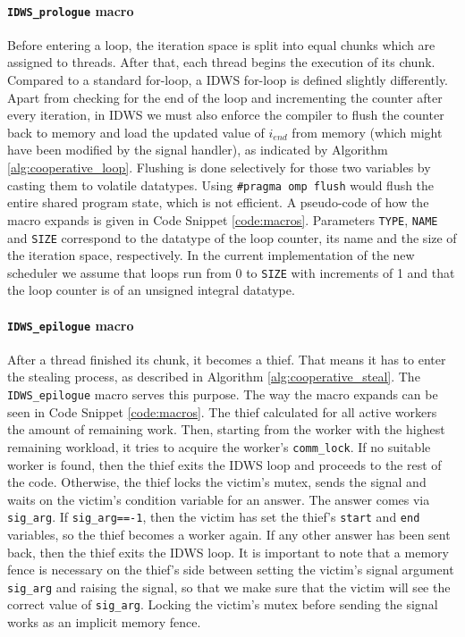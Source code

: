 \documentclass{acm_proc_article-sp}
\begin{document}
\paragraph{\texttt{IDWS\_prologue} macro}
Before entering a loop, the iteration space is split into equal chunks which 
are assigned to threads. After that, each thread begins the execution of its 
chunk. Compared to a standard for-loop, a IDWS for-loop is defined slightly 
differently. Apart from checking for the end of the loop and incrementing the 
counter after every iteration, in IDWS we must also enforce the compiler to 
flush the counter back to memory and load the updated value of $i_{end}$ from 
memory (which might have been modified by the signal handler), as indicated by 
Algorithm \ref{alg:cooperative_loop}. Flushing is done selectively for those 
two variables by casting them to volatile datatypes. Using \texttt{\#pragma omp 
flush} would flush the entire shared program state, which is not efficient. A 
pseudo-code of how the macro expands is given in Code Snippet 
\ref{code:macros}. Parameters \texttt{TYPE}, \texttt{NAME} and \texttt{SIZE} 
correspond to the datatype of the loop counter, its name and the size of the 
iteration space, respectively. In the current implementation of the new 
scheduler we assume that loops run from 0 to \texttt{SIZE} with increments of 1 
and that the loop counter is of an unsigned integral datatype.

\paragraph{\texttt{IDWS\_epilogue} macro}
After a thread finished its chunk, it becomes a thief. That means it has to 
enter the stealing process, as described in Algorithm 
\ref{alg:cooperative_steal}. The \texttt{IDWS\_epilogue} macro serves this 
purpose. The way the macro expands can be seen in Code Snippet 
\ref{code:macros}. The thief calculated for all active workers the amount of 
remaining work. Then, starting from the worker with the highest remaining 
workload, it tries to acquire the worker's \texttt{comm\_lock}. If no suitable 
worker is found, then the thief exits the IDWS loop and proceeds to the rest of 
the code. Otherwise, the thief locks the victim's mutex, sends the signal and 
waits on the victim's condition variable for an answer. The answer comes via 
\texttt{sig\_arg}. If \texttt{sig\_arg==-1}, then the victim has set the 
thief's \texttt{start} and \texttt{end} variables, so the thief becomes a 
worker again. If any other answer has been sent back, then the thief exits the 
IDWS loop. It is important to note that a memory fence is necessary on the
thief's side between setting the victim's signal argument \texttt{sig\_arg} and
raising the signal, so that we make sure that the victim will see the correct
value of \texttt{sig\_arg}. Locking the victim's mutex before sending the signal
works as an implicit memory fence.
\end{document}
